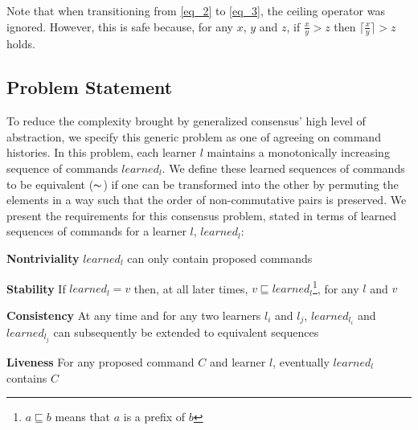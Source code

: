 Note that when transitioning from \eqref{eq_2} to \eqref{eq_3}, the ceiling operator was ignored. However, this is safe because, for any $x$, $y$ and $z$, if $\frac{x}{y} > z$ then $\lceil \frac{x}{y} \rceil > z$ holds.\par

\subsection{Problem Statement}
To reduce the complexity brought by generalized consensus' high level of abstraction, we specify this generic problem as one of agreeing on command histories. In this problem, each learner $l$ maintains a monotonically increasing sequence of commands $learned_l$. We define these learned sequences of commands to be equivalent ($\thicksim$) if one can be transformed into the other by permuting the elements in a way such that the order of non-commutative pairs is preserved. We present the requirements for this consensus problem, stated in terms of learned sequences of commands for a learner $l$, $learned_l$:\par
\textbf{Nontriviality} $learned_l$ can only contain proposed commands \par
\textbf{Stability} If $learned_l = v$ then, at all later times, $v \sqsubseteq learned_l$\footnote{$a \sqsubseteq b$ means that $a$ is a prefix of $b$}, for any $l$ and $v$ \par
\textbf{Consistency} At any time and for any two learners $l_i$ and $l_j$, $learned_{l_i}$ and $learned_{l_j}$ can subsequently be extended to equivalent sequences\par
\textbf{Liveness} For any proposed command $C$ and learner $l$, eventually $learned_l$ contains $C$ \par

